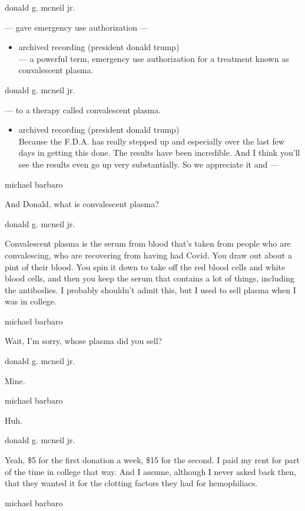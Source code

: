 donald g. mcneil jr.

--- gave emergency use authorization ---

\begin{itemize}
\tightlist
\item
  archived recording (president donald trump)\\
  --- a powerful term, emergency use authorization for a treatment known
  as convalescent plasma.
\end{itemize}

donald g. mcneil jr.

--- to a therapy called convalescent plasma.

\begin{itemize}
\tightlist
\item
  archived recording (president donald trump)\\
  Because the F.D.A. has really stepped up and especially over the last
  few days in getting this done. The results have been incredible. And I
  think you'll see the results even go up very substantially. So we
  appreciate it and ---
\end{itemize}

michael barbaro

And Donald, what is convalescent plasma?

donald g. mcneil jr.

Convalescent plasma is the serum from blood that's taken from people who
are convalescing, who are recovering from having had Covid. You draw out
about a pint of their blood. You spin it down to take off the red blood
cells and white blood cells, and then you keep the serum that contains a
lot of things, including the antibodies. I probably shouldn't admit
this, but I used to sell plasma when I was in college.

michael barbaro

Wait, I'm sorry, whose plasma did you sell?

donald g. mcneil jr.

Mine.

michael barbaro

Huh.

donald g. mcneil jr.

Yeah, \$5 for the first donation a week, \$15 for the second. I paid my
rent for part of the time in college that way. And I assume, although I
never asked back then, that they wanted it for the clotting factors they
had for hemophiliacs.

michael barbaro

